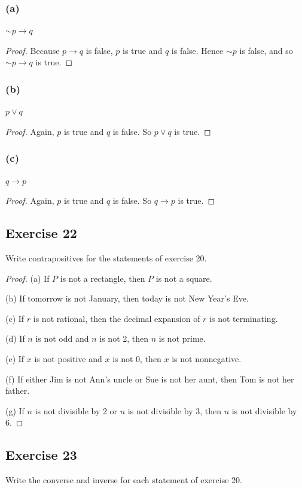 \documentclass[14pt]{extarticle}
\begin{document}
\subsubsection{(a)} 
${\sim p} \to q$

\begin{proof} 
Because $p \to q$ is false, $p$ is true and $q$ is false. Hence ${\sim p}$ is false, and so ${\sim p} \to q$ is true. \end{proof}

\subsubsection{(b)} 
$p \vee q$
\begin{proof} 
Again, $p$ is true and $q$ is false. So $p \vee q$ is true.
\end{proof}

\subsubsection{(c)} 
$q \to p$

\begin{proof} 
Again, $p$ is true and $q$ is false. So $q \to p$ is true.
\end{proof}

\subsection{Exercise 22} 
Write contrapositives for the statements of exercise 20.

\begin{proof} 
(a) If $P$ is not a rectangle, then $P$ is not a square.

(b) If tomorrow is not January, then today is not New Year’s Eve.

(c) If $r$ is not rational, then the decimal expansion of $r$ is not terminating.

(d) If $n$ is not odd and $n$ is not 2, then $n$ is not prime.

(e) If $x$ is not positive and $x$ is not 0, then $x$ is not nonnegative.

(f) If either Jim is not Ann’s uncle or Sue is not her aunt, then Tom is not her father.

(g) If $n$ is not divisible by 2 or $n$ is not divisible by 3, then $n$ is not divisible by 6. 
\end{proof}

\subsection{Exercise 23} 
Write the converse and inverse for each statement of exercise 20.
\end{document}

